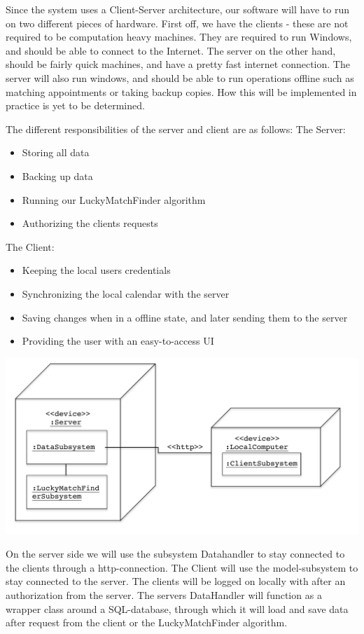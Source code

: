 Since the system uses a Client-Server architecture, our software will have to run on two different pieces of hardware. First off, we have the clients - these are not required to be computation heavy machines. They are required to run Windows, and should be able to connect to the Internet. 
The server on the other hand, should be fairly quick machines, and have a pretty fast internet connection. The server will also run windows, and should be able to run operations offline such as matching appointments or taking backup copies. How this will be implemented in practice is yet to be determined. 


The different responsibilities of the server and client are as follows:
The Server:
\begin{itemize}
	\item Storing all data
	\item Backing up data
	\item Running our LuckyMatchFinder algorithm
	\item Authorizing the clients requests
\end{itemize}
The Client:
\begin{itemize}
	\item Keeping the local users credentials
	\item Synchronizing the local calendar with the server
	\item Saving changes when in a offline state, and later sending them to the server
	\item Providing the user with an easy-to-access UI
\end{itemize}

\begin{center}
\includegraphics[scale=.8]{sections/hardwaremapping.pdf}
\end{center}

On the server side we will use the subsystem Datahandler to stay connected to the clients through a http-connection. The Client will use the model-subsystem to stay connected to the server. The clients will be logged on locally with after an authorization from the server.
The servers DataHandler will function as a wrapper class around a SQL-database, through which it will load and save data after request from the client or the LuckyMatchFinder algorithm. 

